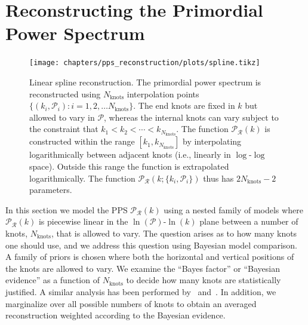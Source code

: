 \newcommand{\PR}{\mathcal{P}_\mathcal{R}}
\newcommand{\alphamink}{\alpha_\mathrm{min}^{(k)}}
\newcommand{\alphamaxk}{\alpha_\mathrm{max}^{(k)}}
\newcommand{\Pknotj}[1]{\mathcal{P}_{#1}}
\newcommand{\Pknot}{\mathcal{P}}
\newcommand{\As}{A_\mathrm{s}}
\newcommand{\Asj}[1]{A_\mathrm{s}^{(#1)}}
\newcommand{\Nint}{N_\mathrm{int}}
\newcommand{\Nknots}{N_\mathrm{knots}}
\newcommand{\Planck}{\textit{Planck}}


\chapter[PPS reconstruction]{Reconstructing the Primordial Power Spectrum}
\label{chap:rec}

\begin{figure}[tp]
    \texttt{[image: chapters/pps\_reconstruction/plots/spline.tikz]}
  \caption{%
    Linear spline reconstruction. The primordial power spectrum is reconstructed using $\Nknots$ interpolation points
    ${\{(k_i,\Pknotj{i}):i=1,2,\ldots {\Nknots}\}}$. The end knots are fixed in $k$ but allowed to
    vary in ${\Pknot}$, whereas the internal knots can vary subject to the constraint that ${k_1<k_2<\cdots<k_{\Nknots}}$.
    The function $\mathcal{P}_\mathcal{R}(k)$ is constructed within the range $[k_1,k_{\Nknots}]$
    by interpolating logarithmically between adjacent knots (i.e., linearly in $\log$-$\log$ space). Outside this range the function is extrapolated logarithmically.
    The function $\mathcal{P}_\mathcal{R}(k;\{k_i,\Pknotj{i}\})$ thus has $2\Nknots-2$ parameters.\label{fig:linear_spline_reconstruction}
  }
\end{figure}



In this section we model the PPS $\PR(k)$ using a nested
family of models where $\PR(k)$ is piecewise linear
in the $\ln (\mathcal{P})$-$\ln (k)$ plane
between a number of knots, $\Nknots$,
that is allowed to vary. The question arises as to how many knots one should use,
and we address this question using Bayesian model comparison.
A family of priors
is chosen where both the horizontal and vertical positions of the knots are allowed
to vary. We examine the ``Bayes factor'' or ``Bayesian evidence'' as a function of
$\Nknots$ to decide how many knots are statistically justified. 
A similar analysis has been performed by~\cite{vazquez_knots} and~\cite{knottedsky1}.
In addition, we marginalize over all possible numbers of knots to obtain 
an averaged reconstruction weighted according to the Bayesian evidence.

